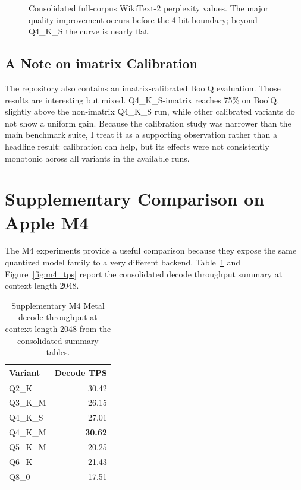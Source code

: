 \documentclass{article}
\begin{document}
\begin{figure}[t]
\centering
{}
\caption{Consolidated full-corpus WikiText-2 perplexity values. The major quality improvement occurs before the 4-bit boundary; beyond Q4\_K\_S the curve is nearly flat.}
\label{fig:ppl_curve}
\end{figure}

\subsection{A Note on imatrix Calibration}

The repository also contains an imatrix-calibrated BoolQ evaluation. Those results are interesting but mixed. Q4\_K\_S-imatrix reaches 75\% on BoolQ, slightly above the non-imatrix Q4\_K\_S run, while other calibrated variants do not show a uniform gain. Because the calibration study was narrower than the main benchmark suite, I treat it as a supporting observation rather than a headline result: calibration can help, but its effects were not consistently monotonic across all variants in the available runs.

\section{Supplementary Comparison on Apple M4}
\label{sec:m4}

The M4 experiments provide a useful comparison because they expose the same quantized model family to a very different backend. Table~\ref{tab:m4} and Figure~\ref{fig:m4_tps} report the consolidated decode throughput summary at context length 2048.

\begin{table}[t]
\centering
\caption{Supplementary M4 Metal decode throughput at context length 2048 from the consolidated summary tables.}
\label{tab:m4}
\small
\begin{tabular}{lr}
\toprule
\textbf{Variant} & \textbf{Decode TPS} \\
\midrule
Q2\_K    & 30.42 \\
Q3\_K\_M & 26.15 \\
Q4\_K\_S & 27.01 \\
Q4\_K\_M & \textbf{30.62} \\
Q5\_K\_M & 20.25 \\
Q6\_K    & 21.43 \\
Q8\_0    & 17.51 \\
\bottomrule
\end{tabular}
\end{table}
\end{document}
